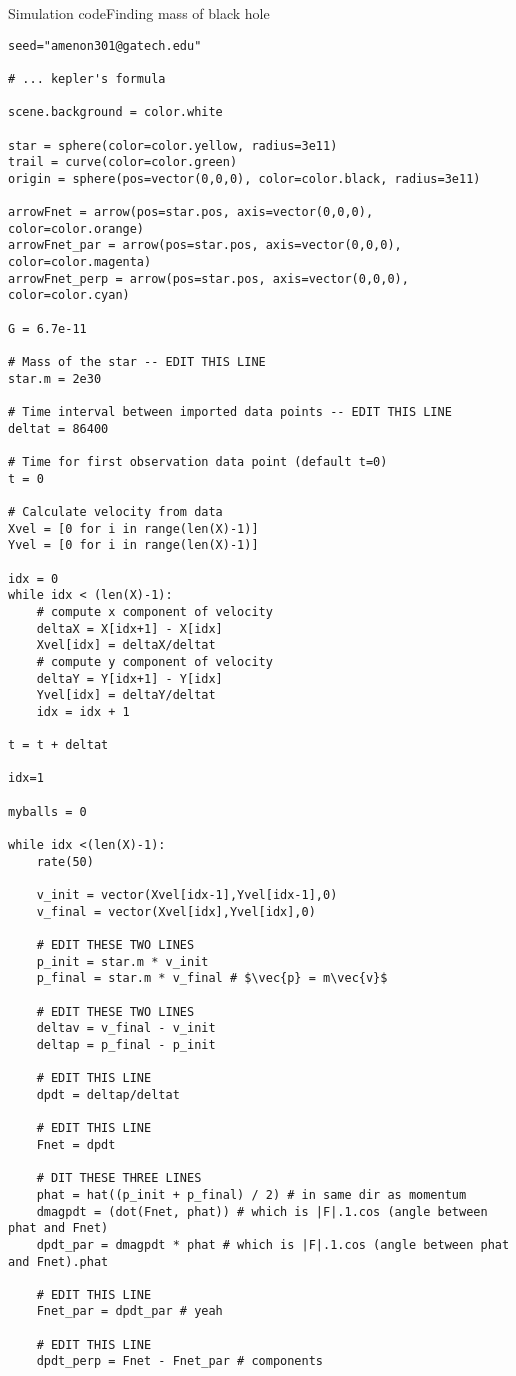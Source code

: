 \begin{frame}[fragile]{Simulation code}{Finding mass of black hole}
\begin{multicols}{2}
\begin{verbatim}
seed="amenon301@gatech.edu"

# ... kepler's formula

scene.background = color.white

star = sphere(color=color.yellow, radius=3e11)
trail = curve(color=color.green)
origin = sphere(pos=vector(0,0,0), color=color.black, radius=3e11)

arrowFnet = arrow(pos=star.pos, axis=vector(0,0,0), color=color.orange)
arrowFnet_par = arrow(pos=star.pos, axis=vector(0,0,0), color=color.magenta)
arrowFnet_perp = arrow(pos=star.pos, axis=vector(0,0,0), color=color.cyan)

G = 6.7e-11

# Mass of the star -- EDIT THIS LINE
star.m = 2e30

# Time interval between imported data points -- EDIT THIS LINE
deltat = 86400

# Time for first observation data point (default t=0)
t = 0

# Calculate velocity from data
Xvel = [0 for i in range(len(X)-1)]  
Yvel = [0 for i in range(len(X)-1)]  

idx = 0
while idx < (len(X)-1):
    # compute x component of velocity
    deltaX = X[idx+1] - X[idx]
    Xvel[idx] = deltaX/deltat
    # compute y component of velocity 
    deltaY = Y[idx+1] - Y[idx]
    Yvel[idx] = deltaY/deltat
    idx = idx + 1

t = t + deltat 

idx=1

myballs = 0

while idx <(len(X)-1):
    rate(50) 

    v_init = vector(Xvel[idx-1],Yvel[idx-1],0)
    v_final = vector(Xvel[idx],Yvel[idx],0)

    # EDIT THESE TWO LINES
    p_init = star.m * v_init 
    p_final = star.m * v_final # $\vec{p} = m\vec{v}$
    
    # EDIT THESE TWO LINES
    deltav = v_final - v_init
    deltap = p_final - p_init
    
    # EDIT THIS LINE
    dpdt = deltap/deltat

    # EDIT THIS LINE
    Fnet = dpdt

    # DIT THESE THREE LINES
    phat = hat((p_init + p_final) / 2) # in same dir as momentum 
    dmagpdt = (dot(Fnet, phat)) # which is |F|.1.cos (angle between phat and Fnet)
    dpdt_par = dmagpdt * phat # which is |F|.1.cos (angle between phat and Fnet).phat

    # EDIT THIS LINE
    Fnet_par = dpdt_par # yeah

    # EDIT THIS LINE
    dpdt_perp = Fnet - Fnet_par # components

    
\end{verbatim}
\end{multicols}
\end{frame}

